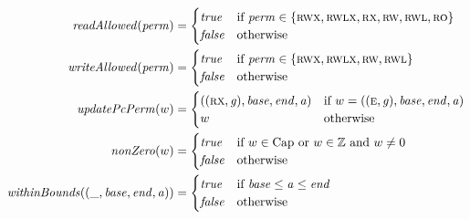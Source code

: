 \documentclass[a4paper]{article}
\newcommand{\false}{\mathit{false}}
\newcommand{\true}{\mathit{true}}
\newcommand{\var}[1]{\mathit{#1}}
\newcommand{\gl}{\var{g}}
\newcommand{\addr}{\var{a}}
\newcommand{\start}{\var{base}}
\newcommand{\addrend}{\var{end}}
\newcommand{\perm}{\var{perm}}
\newcommand{\plainfun}[2]{
  \ifthenelse{\equal{#2}{}}
  {\mathit{#1}}
  {\mathit{#1}(#2)}
}
\newcommand{\updatePcPerm}[1]{\plainfun{updatePcPerm}{#1}}
\newcommand{\executeAllowed}[1]{\plainfun{executeAllowed}{#1}}
\newcommand{\nonZero}[1]{\plainfun{nonZero}{#1}}
\newcommand{\readAllowed}[1]{\plainfun{readAllowed}{#1}}
\newcommand{\writeAllowed}[1]{\plainfun{writeAllowed}{#1}}
\newcommand{\withinBounds}[1]{\plainfun{withinBounds}{#1}}
\newcommand{\plaindom}[1]{\mathrm{#1}}
\newcommand{\Caps}{\plaindom{Cap}}
\newcommand{\ints}{\mathbb{Z}}
\newcommand{\plainperm}[1]{\textsc{#1}}
\newcommand{\readonly}{\plainperm{ro}}
\newcommand{\readwrite}{\plainperm{rw}}
\newcommand{\exec}{\plainperm{rx}}
\newcommand{\entry}{\plainperm{e}}
\newcommand{\rwx}{\plainperm{rwx}}
\newcommand{\readwritel}{\plainperm{rwl}}
\newcommand{\rwlx}{\plainperm{rwlx}}
\begin{document}
\begin{align*}
  \readAllowed{\perm} &=
                        \begin{cases}
                          \true & \text{if } \perm \in \{ \rwx, \rwlx, \exec, \readwrite, \readwritel, \readonly \} \\
                          \false & \text{otherwise}
                        \end{cases} \\
  \writeAllowed{\perm} &=
                         \begin{cases}
                           \true &
                           \text{if } \perm \in \{ \rwx, \rwlx, \readwrite, \readwritel\} \\
                           \false & \text{otherwise}
                         \end{cases} \\
  \updatePcPerm{w} &=
                     \begin{cases}
                       ((\exec,\gl),\start,\addrend,\addr) & \text{if $w = ((\entry,\gl),\start,\addrend,\addr)$}\\
                       w & \text{otherwise} 
                     \end{cases} \\
  \nonZero{w} &=
                \begin{cases}
                  \true & \text{if $w\in \Caps$ or $w\in \ints$ and $w \neq 0$}\\
                  \false & \text{otherwise}
                \end{cases} \\
  \withinBounds{(\_,\start,\addrend,\addr)} &=
                                              \begin{cases}
                                                \true  & \text{if $\start \leq \addr \leq \addrend$} \\
                                                \false & \text{otherwise}
                                              \end{cases} \\

\end{align*}
\end{document}

